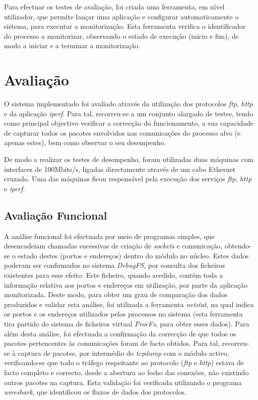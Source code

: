 \documentclass[a4paper]{llncs}
\begin{document}
Para efectuar os testes de avaliação, foi criada uma ferramenta, em nível utilizador, que permite lançar uma aplicação e configurar automaticamente o sistema, para executar a monitorização.
 Esta ferramenta verifica o identificador do processo a monitorizar, observando o estado de execução (início e fim), de modo a iniciar e a terminar a monitorização.

\section{Avaliação}
\label{sec:evaluation}

O sistema implementado foi avaliado através da utilização dos protocolos \textit{ftp}, \textit{http} e da aplicação \textit{iperf}\cite{iperf}.
 Para tal, recorreu-se a um conjunto alargado de testes, tendo como principal objectivo verificar a correcção do funcionamento, a sua capacidade de capturar todos os pacotes envolvidos nas comunicações do processo alvo (e apenas estes), bem como observar o seu desempenho.

De modo a realizar os testes de desempenho, foram utilizadas duas máquinas com interfaces de 100Mbits/s, ligadas directamente através de um cabo Ethernet cruzado. Uma das máquinas ficou responsável pela execução dos serviços \textit{ftp}, \textit{http} e \textit{iperf}.

\subsection{Avaliação Funcional}
A análise funcional foi efectuada por meio de programas simples, que desencadeiam chamadas sucessivas de criação de \textit{sockets} e comunicação, obtendo-se o estado destes (portos e endereços) dentro do módulo no núcleo.
 Estes dados poderam ser confirmados no sistema \textit{DebugFS}, por consulta dos ficheiros existentes para esse efeito. Este ficheiro, quando acedido, contém toda a informação relativa aos portos e endereços em utilização, por parte da aplicação monitorizada.
 Deste modo, para obter um grau de comparação dos dados produzidos e validar esta análise, foi utilizada a ferramenta \textit{netstat}, na qual indica os portos e os endereços utilizados pelos processos no sistema (esta ferramenta tira partido do sistema de ficheiros virtual \textit{ProcFs}, para obter esses dados).
 Para além desta análise, foi efectuada a confirmação da correcção de que todos os pacotes pertencentes às comunicações foram de facto obtidos.
 Para tal, recorreu-se à captura de pacotes, por intermédio do \textit{tcpdump} com o módulo activo, verificando-se que todo o tráfego respeitante ao protocolo (\textit{ftp} e \textit{http}) estava de facto completo e correcto, desde a abertura ao fecho das conexões, não existindo outros pacotes na captura.
 Esta validação foi verificada utilizando o programa \textit{wireshark}, que identificou os fluxos de dados dos protocolos.
\end{document}
